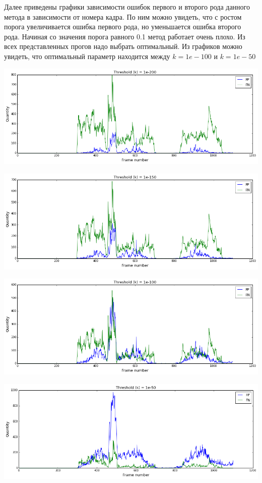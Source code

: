 \documentclass[12pt, a4paper]{article}
\begin{document}
			Далее приведены графики зависимости ошибок первого и второго рода данного метода в зависимости от номера кадра. По ним можно увидеть, что с ростом порога увеличивается ошибка первого рода, но уменьшается ошибка второго рода. Начиная со значения порога равного 0.1 метод работает очень плохо. Из всех представленных прогов надо выбрать оптимальный. Из графиков можно увидеть, что оптимальный параметр находится между $k = 1e-100$ и $k = 1e-50$
			\begin{center}
				\includegraphics[width=17cm]{3_par_rgb_k_1e_200.png}
			\end{center}
			\begin{center}
				\includegraphics[width=17cm]{3_par_rgb_k_1e_150.png}
			\end{center}
			\begin{center}
				\includegraphics[width=17cm]{3_par_rgb_k_1e_100.png}
			\end{center}
			\begin{center}
				\includegraphics[width=17cm]{3_par_rgb_k_1e_50.png}
			\end{center}
\end{document}
